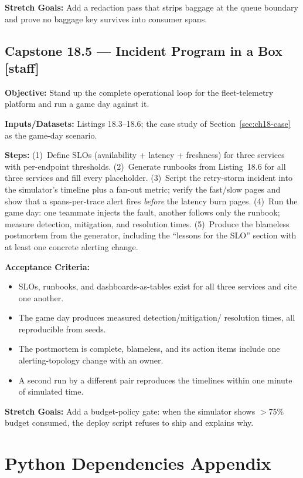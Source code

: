 \textbf{Stretch Goals:} Add a redaction pass that strips baggage at the
queue boundary and prove no baggage key survives into consumer spans.

\subsection*{Capstone 18.5 --- Incident Program in a Box \hfill [staff]}
\textbf{Objective:} Stand up the complete operational loop for the
fleet-telemetry platform and run a game day against it.

\textbf{Inputs/Datasets:} Listings 18.3--18.6; the case study of
Section~\ref{sec:ch18-case} as the game-day scenario.

\textbf{Steps:} (1)~Define SLOs (availability + latency + freshness) for
three services with per-endpoint thresholds. (2)~Generate runbooks from
Listing~18.6 for all three services and fill every placeholder.
(3)~Script the retry-storm incident into the simulator's timeline plus a
fan-out metric; verify the fast/slow pages and show that a
spans-per-trace alert fires \emph{before} the latency burn pages.
(4)~Run the game day: one teammate injects the fault, another follows only
the runbook; measure detection, mitigation, and resolution times.
(5)~Produce the blameless postmortem from the generator, including the
``lessons for the SLO'' section with at least one concrete alerting change.

\textbf{Acceptance Criteria:}
\begin{itemize}
  \item[$\square$] SLOs, runbooks, and dashboards-as-tables exist for all
        three services and cite one another.
  \item[$\square$] The game day produces measured detection/mitigation/
        resolution times, all reproducible from seeds.
  \item[$\square$] The postmortem is complete, blameless, and its action
        items include one alerting-topology change with an owner.
  \item[$\square$] A second run by a different pair reproduces the
        timelines within one minute of simulated time.
\end{itemize}

\textbf{Stretch Goals:} Add a budget-policy gate: when the simulator shows
$>$75\% budget consumed, the deploy script refuses to ship and explains why.

\section{Python Dependencies Appendix}
\label{sec:ch18-deps}

